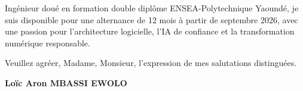 \documentclass[a4paper,11pt]{article}
\begin{document}
\vspace{0.8em}

Ing\'enieur dou\'e en formation double diplôme ENSEA-Polytechnique Yaoundé, je suis disponible pour une alternance de 12 mois à partir de septembre 2026, avec une passion pour l'architecture logicielle, l'IA de confiance et la transformation num\'erique responsable.

\vspace{1.5em}
\noindent Veuillez agr\'eer, Madame, Monsieur, l'expression de mes salutations distingu\'ees.

\vspace{2em}
\noindent \textbf{Lo\"ic Aron MBASSI EWOLO}
\end{document}
